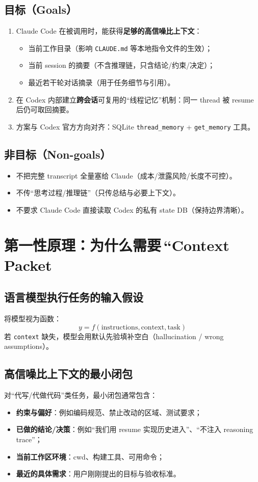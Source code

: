 \documentclass[UTF8,11pt]{ctexart}
\begin{document}
\subsection{目标（Goals）}
\begin{enumerate}[nosep]
  \item Claude Code 在被调用时，能获得\textbf{足够的高信噪比上下文}：
    \begin{itemize}[nosep]
      \item 当前工作目录（影响 \texttt{CLAUDE.md} 等本地指令文件的生效）；
      \item 当前 session 的摘要（不含推理链，只含结论/约束/决定）；
      \item 最近若干轮对话摘录（用于任务细节与引用）。
    \end{itemize}
  \item 在 Codex 内部建立\textbf{跨会话}可复用的“线程记忆”机制：同一 thread 被 resume 后仍可取回摘要。
  \item 方案与 Codex 官方方向对齐：SQLite \texttt{thread\_memory} + \texttt{get\_memory} 工具。
\end{enumerate}

\subsection{非目标（Non-goals）}
\begin{itemize}[nosep]
  \item 不把完整 transcript 全量塞给 Claude（成本/泄露风险/长度不可控）。
  \item 不传“思考过程/推理链”（只传总结与必要上下文）。
  \item 不要求 Claude Code 直接读取 Codex 的私有 state DB（保持边界清晰）。
\end{itemize}

\section{第一性原理：为什么需要\,``Context Packet}
\subsection{语言模型执行任务的输入假设}
将模型视为函数：
\[
  y = f(\text{instructions}, \text{context}, \text{task})
\]
若 \texttt{context} 缺失，模型会用默认先验填补空白（hallucination / wrong assumptions）。

\subsection{高信噪比上下文的最小闭包}
对“代写/代做代码”类任务，最小闭包通常包含：
\begin{itemize}[nosep]
  \item \textbf{约束与偏好}：例如编码规范、禁止改动的区域、测试要求；
  \item \textbf{已做的结论/决策}：例如“我们用 resume 实现历史进入”、“不注入 reasoning trace”；
  \item \textbf{当前工作区环境}：cwd、构建工具、可用命令；
  \item \textbf{最近的具体需求}：用户刚刚提出的目标与验收标准。
\end{itemize}
\end{document}
